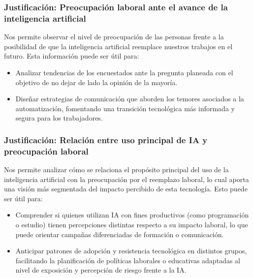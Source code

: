 \documentclass[12pt, a4paper]{article}
\begin{document}
\subsubsection*{Justificación: Preocupación laboral ante el avance de la inteligencia artificial}
Nos permite observar el nivel de preocupación de las personas frente a la posibilidad de que la inteligencia artificial reemplace nuestros trabajos en el futuro. Esta información puede ser útil para:

\begin{itemize}
    \item Analizar tendencias de los encuestados ante la pregunta planeada con el objetivo de no dejar de lado la opinión de la mayoría.
    \item Diseñar estrategias de comunicación que aborden los temores asociados a la automatización, fomentando una transición tecnológica más informada y segura para los trabajadores.
\end{itemize}

\subsubsection*{Justificación: Relación entre uso principal de IA y preocupación laboral}
Nos permite analizar cómo se relaciona el propósito principal del uso de la inteligencia artificial con la preocupación por el reemplazo laboral, lo cual aporta una visión más segmentada del impacto percibido de esta tecnología. Esto puede ser útil para:
\begin{itemize}
    \item Comprender si quienes utilizan IA con fines productivos (como programación o estudio) tienen percepciones distintas respecto a su impacto laboral, lo que puede orientar campañas diferenciadas de formación o comunicación.
    \item Anticipar patrones de adopción y resistencia tecnológica en distintos grupos, facilitando la planificación de políticas laborales o educativas adaptadas al nivel de exposición y percepción de riesgo frente a la IA.
\end{itemize}
\end{document}
